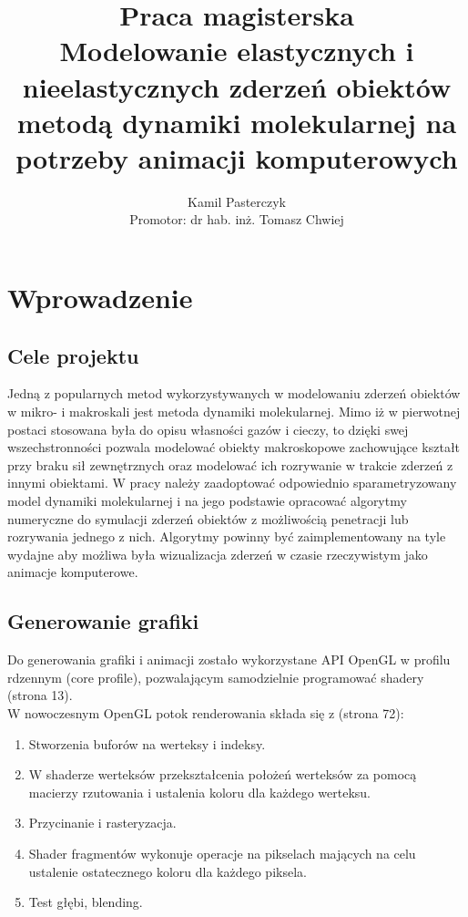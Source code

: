 \documentclass[12pt, letterpaper]{report}
\title{
    Praca magisterska \\
    \large Modelowanie elastycznych i nieelastycznych
    zderzeń obiektów\\
    metodą dynamiki molekularnej na potrzeby animacji
    komputerowych
}
\author{
    Kamil Pasterczyk \\
    \small Promotor: dr hab. inż. Tomasz Chwiej
}
\begin{document}
\maketitle
\tableofcontents

\chapter{Wprowadzenie}
    \section{Cele projektu}
    Jedną z popularnych metod wykorzystywanych w modelowaniu zderzeń obiektów w mikro- i makroskali jest 
    metoda dynamiki molekularnej. Mimo iż w pierwotnej postaci stosowana była do opisu własności gazów i 
    cieczy, to dzięki swej wszechstronności pozwala modelować obiekty makroskopowe zachowujące kształt 
    przy braku sił zewnętrznych oraz modelować ich rozrywanie w trakcie zderzeń z innymi obiektami. W pracy 
    należy zaadoptować odpowiednio sparametryzowany model dynamiki molekularnej i na jego podstawie opracować 
    algorytmy numeryczne do symulacji zderzeń obiektów z możliwością penetracji lub rozrywania jednego z nich. 
    Algorytmy powinny być zaimplementowany na tyle wydajne aby możliwa była wizualizacja zderzeń w czasie 
    rzeczywistym jako animacje komputerowe.

    \section{Generowanie grafiki}
    Do generowania grafiki i animacji zostało wykorzystane API OpenGL w profilu rdzennym (core profile), 
    pozwalającym samodzielnie programować shadery \cite{grafika3d} (strona 13). \\

    W nowoczesnym OpenGL potok renderowania składa się z \cite{grafika3d} (strona 72):
    \begin{enumerate}
        \item Stworzenia buforów na werteksy i indeksy.
        \item W shaderze werteksów przekształcenia położeń werteksów 
        za pomocą macierzy rzutowania i ustalenia koloru dla każdego werteksu.
        \item Przycinanie i rasteryzacja.
        \item Shader fragmentów wykonuje operacje na pikselach mających na celu 
        ustalenie ostatecznego koloru dla każdego piksela.
        \item Test głębi, blending.
    \end{enumerate}
\end{document}
